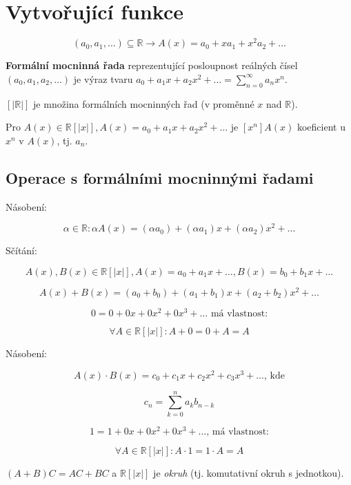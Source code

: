 \chapter{Vytvořující funkce}

$$
(a_{0}, a_{1}, \dots) \subseteq \mathbb{R} \to A(x) = a_{0} + x a_{1} + x^{2} a_{2} + \dots
$$

\begin{definice}
	\textbf{Formální mocninná řada} reprezentující posloupnost reálných čísel $(a_{0}, a_{1}, a_{2}, \dots)$ je výraz tvaru $a_{0} + a_{1}x+ a_{2}x^{2}+ \dots = \sum_{n=0}^{\infty}a_{n}x^{n}$.
\end{definice}

\begin{definice}[Značení]
	$[|\mathbb{R}|]$ je množina formálních mocninných řad (v proměnné $x$ nad $\mathbb{R}$).
\end{definice}

Pro $A(x) \in \mathbb{R}[|x|], A(x) = a_{0} + a_{1}x + a_{2} x^{2} + \dots$ je $[x^{n}]A(x)$ koeficient u $x^{n}$ v $A(x)$, tj. $a_n$.

\section{Operace s formálními mocninnými řadami}

Násobení:

$$
\alpha \in \mathbb{R}: \alpha A(x) = (\alpha a_{0}) + (\alpha a_{1}) x + (\alpha a_{2})x^{2} + \dots
$$

Sčítání:

$$
A(x), B(x) \in \mathbb{R}[|x|], A(x) = a_{0} + a_{1}x + \dots, B(x) = b_{0} +b_{1}x + \dots
$$

$$
A(x) + B(x) = (a_{0} + b_{0}) + (a_{1} + b_{1})x + (a_{2} + b_{2}) x^{2} + \dots
$$

$$
0 = 0 + 0x + 0x^{2} + 0x^{3} + \dots \text{ má vlastnost:}
$$

$$
\forall A \in \mathbb{R}[|x|]: A + 0 = 0 + A = A
$$

Násobení:

$$
A(x) \cdot B(x) = c_{0} + c_{1}x + c_{2}x^{2} + c_{3} x^{3} + \dots \text{, kde}
$$

$$
c_{n} = \sum_{k=0}^{n}a_{k}b_{n-k}
$$

$$
1 = 1 + 0x + 0x^{2} + 0x^{3} + \dots \text{, má vlastnost:}
$$

$$
\forall A \in \mathbb{R}[|x|]: A \cdot 1 = 1 \cdot A = A
$$

\begin{fakt}
	$(A+B)C = AC + BC$ a $\mathbb{R}[|x|]$ je \textit{okruh} (tj. komutativní okruh s jednotkou).
\end{fakt}

